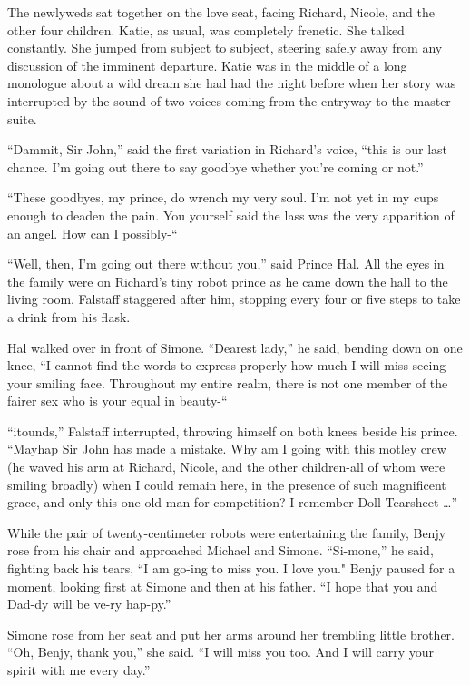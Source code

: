 \documentclass[]{article}
\begin{document}
{The newlyweds sat together on the love seat, facing Richard, Nicole, and the other four children.  Katie, as usual, was completely frenetic.  She talked constantly.  She jumped from subject to subject, steering safely away from any discussion of the imminent departure.  Katie was in the middle of a long monologue about a wild dream she had had the night before when her story was interrupted by the sound of two voices coming from the entryway to the master suite.

“Dammit, Sir John,” said the first variation in Richard’s voice, “this is our last chance.  I’m going out there to say goodbye whether you’re coming or not.”

“These goodbyes, my prince, do wrench my very soul.  I’m not yet in my cups enough to deaden the pain.  You yourself said the lass was the very apparition of an angel.  How can I possibly-“

“Well, then, I’m going out there without you,” said Prince Hal.  All the eyes in the family were on Richard’s tiny robot prince as he came down the hall to the living room.  Falstaff staggered after him, stopping every four or five steps to take a drink from his flask.

Hal walked over in front of Simone.  “Dearest lady,” he said, bending down on one knee, “I cannot find the words to express properly how much I will miss seeing your smiling face.  Throughout my entire realm, there is not one member of the fairer sex who is your equal in beauty-“

“itounds,” Falstaff interrupted, throwing himself on both knees beside his prince.  “Mayhap Sir John has made a mistake.  Why am I going with this motley crew (he waved his arm at Richard, Nicole, and the other children-all of whom were smiling broadly) when I could remain here, in the presence of such magnificent grace, and only this one old man for competition? I remember Doll Tearsheet …”

While the pair of twenty-centimeter robots were entertaining the family, Benjy rose from his chair and approached Michael and Simone.  “Si-mone,” he said, fighting back his tears, “I am go-ing to miss you.  I love you."  Benjy paused for a moment, looking first at Simone and then at his father.  “I hope that you and Dad-dy will be ve-ry hap-py.”

Simone rose from her seat and put her arms around her trembling little brother.  “Oh, Benjy, thank you,” she said.  “I will miss you too.  And I will carry your spirit with me every day.”

}
\end{document}
